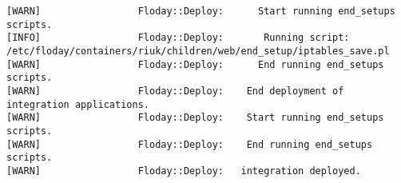 \begin{lstlisting}[float=t, caption={Sortie d'une exécution de \emph{Floday}}, label=fig_1.4_floday, basicstyle=\tiny, xleftmargin=-3cm]
[WARN]                 Floday::Deploy:      Start running end_setups scripts.
[INFO]                 Floday::Deploy:       Running script: /etc/floday/containers/riuk/children/web/end_setup/iptables_save.pl
[WARN]                 Floday::Deploy:      End running end_setups scripts.
[WARN]                 Floday::Deploy:    End deployment of integration applications.
[WARN]                 Floday::Deploy:    Start running end_setups scripts.
[WARN]                 Floday::Deploy:    End running end_setups scripts.
[WARN]                 Floday::Deploy:   integration deployed.
\end{lstlisting}

